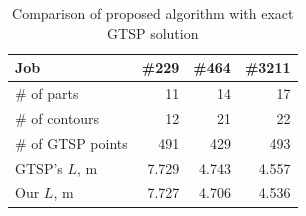 \documentclass{../download/tPRS2e}
\begin{document}
\begin{table}[h]
    \begin{center}    
    \begin{tabular}{l|*{3}{r}}
        Job & \#229 & \#464 & \#3211 \\
        \hline
        \# of parts & 11 & 14 & 17\\
        \# of contours & 12 & 21 & 22 \\
        \# of GTSP points & 491 & 429 & 493 \\
        \hline
        GTSP's $L$, m & 7.729 & 4.743 & 4.557 \\
        Our $L$, m & 7.727 & 4.706 & 4.536 \\
    \end{tabular}
    \caption{Comparison of proposed algorithm with exact GTSP solution}
    \label{exact-3}
    \end{center}
\end{table}
\end{document}

